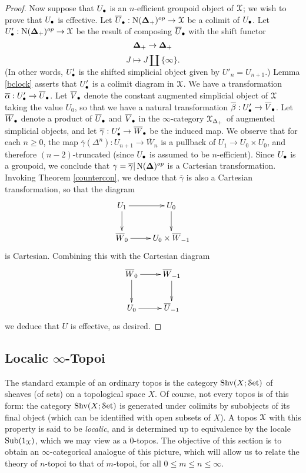 \begin{proof}
Now suppose that $U_{\bullet}$ is an $n$-efficient groupoid object of $\operatorname{\mathcal{X}}$; we wish to prove that $U_{\bullet}$ is effective. Let $\overline{U}_{\bullet}  : \operatorname{N}(\operatorname{{\bf \Delta}}_{+})^{op} \rightarrow \operatorname{\mathcal{X}}$ be a colimit of $U_{\bullet}$. Let $U'_{\bullet}: \operatorname{N}(\operatorname{{\bf \Delta}}_{+})^{op} \rightarrow \operatorname{\mathcal{X}}$
be the result of composing $\overline{U}_{\bullet}$ with the shift functor
$$ \operatorname{{\bf \Delta}}_{+} \rightarrow \operatorname{{\bf \Delta}}_{+}$$
$$ J \mapsto J \amalg \{ \infty \}.$$
(In other words, $U'_{\bullet}$ is the shifted simplicial object given by
$U'_{n} = U_{n+1}$.)
Lemma \ref{bclock} asserts that $U'_{\bullet}$ is a colimit diagram in $\operatorname{\mathcal{X}}$.
We have a transformation $\overline{\alpha}: U'_{\bullet} \rightarrow \overline{U}_{\bullet}$.
Let $\overline{V}_{\bullet}$ denote the constant augmented simplicial object of $\operatorname{\mathcal{X}}$ taking the value $U_0$, so that we have a natural transformation $\overline{\beta}: U'_{\bullet} \rightarrow \overline{V}_{\bullet}$. Let $\overline{W}_{\bullet}$ denote a product of $\overline{U}_{\bullet}$ and $\overline{V}_{\bullet}$ in the $\infty$-category $\operatorname{\mathcal{X}}_{\Delta_{+}}$ of augmented simplicial objects, and let $\overline{\gamma}: U'_{\bullet} \rightarrow \overline{W}_{\bullet}$ be
the induced map. We observe that for each $n \geq 0$, the map 
$\overline{\gamma}(\Delta^n): U_{n+1} \rightarrow \overline{W}_n$ is a pullback of
$U_1 \rightarrow U_0 \times U_0$, and therefore $(n-2)$-truncated (since $U_{\bullet}$ is
assumed to be $n$-efficient). Since $U_{\bullet}$ is a groupoid, we conclude that
$\gamma = \overline{\gamma} | \operatorname{N}(\operatorname{{\bf \Delta}})^{op}$ is a Cartesian transformation. Invoking Theorem \ref{countercon}, we deduce that $\overline{\gamma}$ is also a Cartesian transformation, so that the diagram
$$ \xymatrix{ U_1 \ar[r] \ar[d] &  U_0 \ar[d] \\
\overline{W}_0 \ar[r] & U_0 \times \overline{W}_{-1} }$$
is Cartesian. Combining this with the Cartesian diagram
$$ \xymatrix{ \overline{W}_0 \ar[r] \ar[d] & \overline{W}_{-1} \ar[d] \\
U_0 \ar[r] & \overline{U}_{-1} }$$
we deduce that $U$ is effective, as desired.
\end{proof}

\subsection{Localic $\infty$-Topoi}\label{nlocalic}

The standard example of an ordinary topos is the category $\operatorname{Shv}(X; \operatorname{\mathcal{S}et})$ of sheaves (of sets) on a topological space $X$. Of course, not every topos is of this form: the category $\operatorname{Shv}(X; \operatorname{\mathcal{S}et})$ 
is generated under colimits by subobjects of its final object (which can be identified with open subsets of $X$). A topos $\operatorname{\mathcal{X}}$ with this property is said to be {\it localic}, and is determined up to equivalence by the locale $\operatorname{Sub}(1_{\operatorname{\mathcal{X}}})$, which we may view as a $0$-topos. The objective of this section is to obtain an $\infty$-categorical analogue of this picture, which will allow us to relate the theory of $n$-topoi to that of $m$-topoi, for all $0 \leq m \leq n \leq \infty$.

